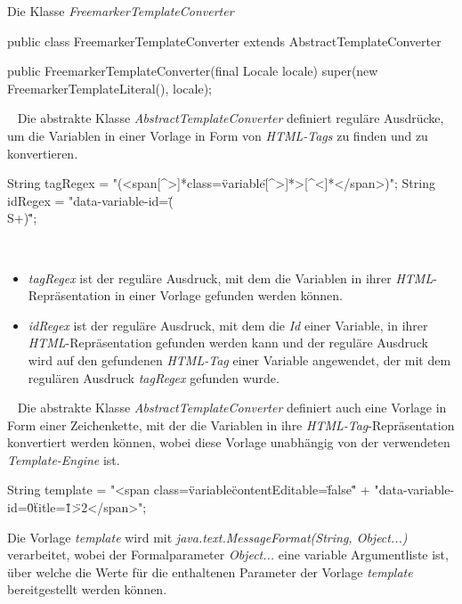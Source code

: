 \begin{program}
\caption{Die Klasse \emph{FreemarkerTemplateConverter}}
\label{prog:freemarkerTemplateConverter}
\begin{JavaCode}
public class FreemarkerTemplateConverter 
                          extends AbstractTemplateConverter {

    public FreemarkerTemplateConverter(final Locale locale) {
        super(new FreemarkerTemplateLiteral(), locale);
    }
}
\end{JavaCode}
\end{program}
\ \newline
Die abstrakte Klasse \emph{AbstractTemplateConverter} definiert reguläre Ausdrücke, um die Variablen in einer Vorlage in Form von \emph{HTML-Tags} zu finden und zu konvertieren.
\begin{JavaCode}[numbers=none]
String tagRegex = "(<span[^>]*class=\"variable\"[^>]*>[^<]*</span>)";
String idRegex  = "data-variable-id=\"(\\S+)\"";
\end{JavaCode}
\ \begin{itemize}
	\item\emph{tagRegex}
	\newline
	ist der reguläre Ausdruck, mit dem die Variablen in ihrer \emph{HTML}-Repräsentation in einer Vorlage gefunden werden können.
	\item\emph{idRegex}
	\newline
	ist der reguläre Ausdruck, mit dem die \emph{Id} einer Variable, in ihrer \emph{HTML}-Repräsentation gefunden werden kann und der reguläre Ausdruck wird auf den gefundenen \emph{HTML-Tag} einer Variable angewendet, der mit dem regulären Ausdruck \emph{tagRegex} gefunden wurde.
\end{itemize}
\ \newline
Die abstrakte Klasse \emph{AbstractTemplateConverter} definiert auch eine Vorlage in Form einer Zeichenkette, mit der die Variablen in ihre \emph{HTML-Tag}-Repräsentation konvertiert werden können, wobei diese Vorlage unabhängig von der verwendeten \emph{Template-Engine} ist.
\begin{JavaCode}
String template = "<span class=\"variable\" contentEditable=\"false\" "
                + "data-variable-id=\"{0}\" title=\"{1}\">{2}</span>";
\end{JavaCode}
Die Vorlage \emph{template} wird mit \emph{java.text.MessageFormat(String, Object...)} verarbeitet, wobei der Formalparameter \emph{Object...} eine variable Argumentliste ist, über welche die Werte für die enthaltenen Parameter der Vorlage \emph{template} bereitgestellt werden können. 
\newpage

